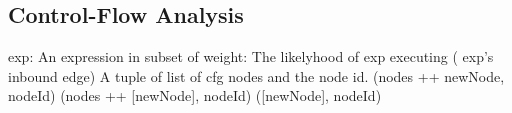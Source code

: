 \subsection{Control-Flow Analysis}
\label{design:cfg}


\begin{algorithm}
    \caption{Control-Flow Graph Psuedocode}\label{alg:cfg}
    \begin{algorithmic}[1]
		\small
		\Input 
			\State exp: An expression in subset of \systemlang
			\State weight: The likelyhood of exp executing (\ie{} exp's inbound edge)
		\EndInput
		\Output
			\State A tuple of list of cfg nodes and the node id.
		\EndOutput
                 \label{alg:cfg-let} 
					 \label{alg:cfg-likelihood}
					\State \Return (nodes ++ newNode, nodeId)
                \EndCase
				 \label{alg:cfg-case}
					\State \Return (nodes ++ [newNode], nodeId)
				\EndCase
					\State \Return ([newNode], nodeId)
                \EndCase
            \EndSwitch
        \EndFunction
    \end{algorithmic}
\end{algorithm}

